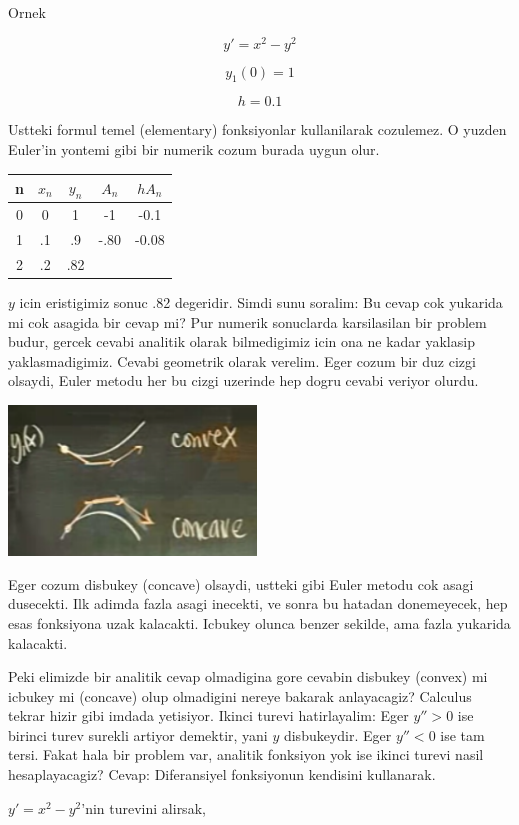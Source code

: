 \documentclass[12pt,fleqn]{article}\usepackage{../common}
\begin{document}
Ornek

\[ y' = x^2 - y^2 \]

\[ y_1(0) = 1 \]

\[ h = 0.1 \]

Ustteki formul temel (elementary) fonksiyonlar kullanilarak cozulemez. O yuzden
Euler'in yontemi gibi bir numerik cozum burada uygun olur. 

\begin{tabular}{ccccc}
n & $x_n$ & $y_n$ & $A_n$ & $hA_n$ \\
\hline
0 & 0 & 1 & -1 & -0.1 \\
\hline
1 & .1 & .9 & -.80 & -0.08 \\
\hline
2 & .2 & .82 &  & 
\end{tabular}

$y$ icin eristigimiz sonuc .82 degeridir. Simdi sunu soralim: Bu cevap cok
yukarida mi cok asagida bir cevap mi? Pur numerik sonuclarda karsilasilan bir
problem budur, gercek cevabi analitik olarak bilmedigimiz icin ona ne kadar
yaklasip yaklasmadigimiz. Cevabi geometrik olarak verelim. Eger cozum bir duz
cizgi olsaydi, Euler metodu her bu cizgi uzerinde hep dogru cevabi veriyor
olurdu. 

\includegraphics[height=4cm]{2_2.png}

Eger cozum disbukey (concave) olsaydi, ustteki gibi Euler metodu cok asagi
dusecekti. Ilk adimda fazla asagi inecekti, ve sonra bu hatadan donemeyecek, hep
esas fonksiyona uzak kalacakti. Icbukey olunca benzer sekilde, ama fazla
yukarida kalacakti. 

Peki elimizde bir analitik cevap olmadigina gore cevabin disbukey (convex) mi
icbukey mi (concave) olup olmadigini nereye bakarak anlayacagiz? Calculus tekrar
hizir gibi imdada yetisiyor. Ikinci turevi hatirlayalim: Eger $y'' > 0$ ise
birinci turev surekli artiyor demektir, yani $y$ disbukeydir. Eger $y'' < 0$ ise
tam tersi. Fakat hala bir problem var, analitik fonksiyon yok ise ikinci turevi
nasil hesaplayacagiz? Cevap: Diferansiyel fonksiyonun kendisini kullanarak.

$y' = x^2 - y^2$'nin turevini alirsak, 
\end{document}
